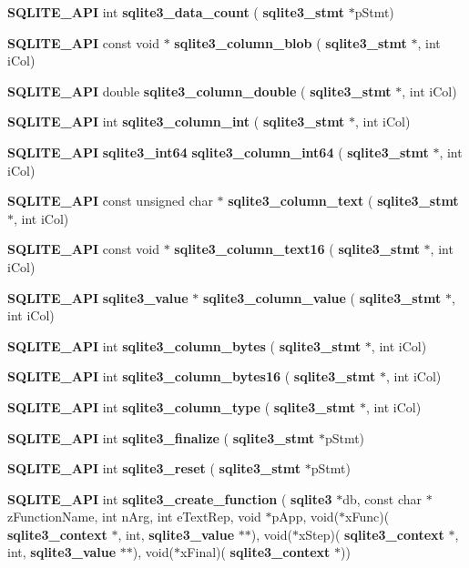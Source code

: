 \begin{DoxyCompactItemize}
\item 
\textbf{ S\+Q\+L\+I\+T\+E\+\_\+\+A\+PI} int \textbf{ sqlite3\+\_\+data\+\_\+count} (\textbf{ sqlite3\+\_\+stmt} $\ast$p\+Stmt)
\item 
\textbf{ S\+Q\+L\+I\+T\+E\+\_\+\+A\+PI} const void $\ast$ \textbf{ sqlite3\+\_\+column\+\_\+blob} (\textbf{ sqlite3\+\_\+stmt} $\ast$, int i\+Col)
\item 
\textbf{ S\+Q\+L\+I\+T\+E\+\_\+\+A\+PI} double \textbf{ sqlite3\+\_\+column\+\_\+double} (\textbf{ sqlite3\+\_\+stmt} $\ast$, int i\+Col)
\item 
\textbf{ S\+Q\+L\+I\+T\+E\+\_\+\+A\+PI} int \textbf{ sqlite3\+\_\+column\+\_\+int} (\textbf{ sqlite3\+\_\+stmt} $\ast$, int i\+Col)
\item 
\textbf{ S\+Q\+L\+I\+T\+E\+\_\+\+A\+PI} \textbf{ sqlite3\+\_\+int64} \textbf{ sqlite3\+\_\+column\+\_\+int64} (\textbf{ sqlite3\+\_\+stmt} $\ast$, int i\+Col)
\item 
\textbf{ S\+Q\+L\+I\+T\+E\+\_\+\+A\+PI} const unsigned char $\ast$ \textbf{ sqlite3\+\_\+column\+\_\+text} (\textbf{ sqlite3\+\_\+stmt} $\ast$, int i\+Col)
\item 
\textbf{ S\+Q\+L\+I\+T\+E\+\_\+\+A\+PI} const void $\ast$ \textbf{ sqlite3\+\_\+column\+\_\+text16} (\textbf{ sqlite3\+\_\+stmt} $\ast$, int i\+Col)
\item 
\textbf{ S\+Q\+L\+I\+T\+E\+\_\+\+A\+PI} \textbf{ sqlite3\+\_\+value} $\ast$ \textbf{ sqlite3\+\_\+column\+\_\+value} (\textbf{ sqlite3\+\_\+stmt} $\ast$, int i\+Col)
\item 
\textbf{ S\+Q\+L\+I\+T\+E\+\_\+\+A\+PI} int \textbf{ sqlite3\+\_\+column\+\_\+bytes} (\textbf{ sqlite3\+\_\+stmt} $\ast$, int i\+Col)
\item 
\textbf{ S\+Q\+L\+I\+T\+E\+\_\+\+A\+PI} int \textbf{ sqlite3\+\_\+column\+\_\+bytes16} (\textbf{ sqlite3\+\_\+stmt} $\ast$, int i\+Col)
\item 
\textbf{ S\+Q\+L\+I\+T\+E\+\_\+\+A\+PI} int \textbf{ sqlite3\+\_\+column\+\_\+type} (\textbf{ sqlite3\+\_\+stmt} $\ast$, int i\+Col)
\item 
\textbf{ S\+Q\+L\+I\+T\+E\+\_\+\+A\+PI} int \textbf{ sqlite3\+\_\+finalize} (\textbf{ sqlite3\+\_\+stmt} $\ast$p\+Stmt)
\item 
\textbf{ S\+Q\+L\+I\+T\+E\+\_\+\+A\+PI} int \textbf{ sqlite3\+\_\+reset} (\textbf{ sqlite3\+\_\+stmt} $\ast$p\+Stmt)
\item 
\textbf{ S\+Q\+L\+I\+T\+E\+\_\+\+A\+PI} int \textbf{ sqlite3\+\_\+create\+\_\+function} (\textbf{ sqlite3} $\ast$db, const char $\ast$z\+Function\+Name, int n\+Arg, int e\+Text\+Rep, void $\ast$p\+App, void($\ast$x\+Func)(\textbf{ sqlite3\+\_\+context} $\ast$, int, \textbf{ sqlite3\+\_\+value} $\ast$$\ast$), void($\ast$x\+Step)(\textbf{ sqlite3\+\_\+context} $\ast$, int, \textbf{ sqlite3\+\_\+value} $\ast$$\ast$), void($\ast$x\+Final)(\textbf{ sqlite3\+\_\+context} $\ast$))

\end{DoxyCompactItemize}
